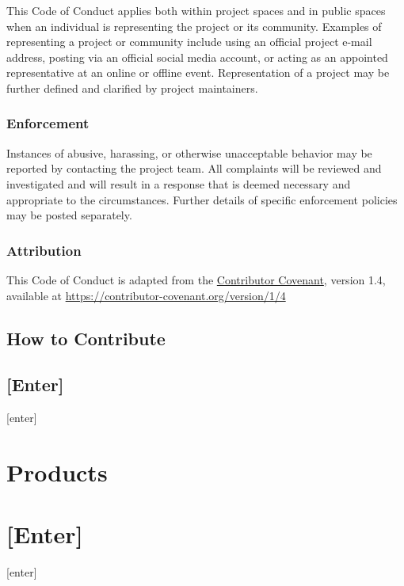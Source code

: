 \documentclass[
  letterpaper,
  oneside,
  open=any]{scrbook}
\begin{document}
This Code of Conduct applies both within project spaces and in public
spaces when an individual is representing the project or its community.
Examples of representing a project or community include using an
official project e-mail address, posting via an official social media
account, or acting as an appointed representative at an online or
offline event. Representation of a project may be further defined and
clarified by project maintainers.

\section{Enforcement}\label{enforcement}

Instances of abusive, harassing, or otherwise unacceptable behavior may
be reported by contacting the project team. All complaints will be
reviewed and investigated and will result in a response that is deemed
necessary and appropriate to the circumstances. Further details of
specific enforcement policies may be posted separately.

\section{Attribution}\label{attribution}

This Code of Conduct is adapted from the
\href{https://contributor-covenant.org}{Contributor Covenant}, version
1.4, available at
\href{https://contributor-covenant.org/version/1/4/}{https://contributor-covenant.org/version/1/4}

\chapter{How to Contribute}\label{how-to-contribute}

\chapter{{[}Enter{]}}\label{enter}

{[}enter{]}

\part{Products}

\part{{[}Enter{]}}

{[}enter{]}
\end{document}
